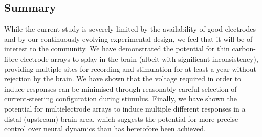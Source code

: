 \documentclass[10pt,letterpaper]{article}
\begin{document}
\subsection{Summary}

While the current study is severely limited by the availability of
good electrodes and by our continuously evolving experimental design,
we feel that it will be of interest to the community. We have
demonstrated the potential for thin carbon-fibre electrode arrays to
splay in the brain (albeit with significant inconsistency), providing
multiple sites for recording and stimulation for at least a year
without rejection by the brain. We have shown that the voltage
required in order to induce responses can be minimised through
reasonably careful selection of current-steering configuration during
stimulus. Finally, we have shown the potential for multielectrode
arrays to induce multiple different responses in a distal (upstream)
brain area, which suggests the potential for more precise control over
neural dynamics than has heretofore been achieved.



\end{document}
